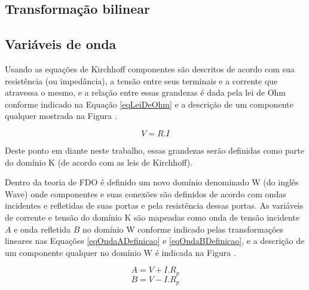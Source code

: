 	\subsection{Transformação bilinear}
	
	
	\subsection{Variáveis de onda}
	
	Usando as equações de Kirchhoff componentes são descritos de acordo com sua resistência (ou impedância), a tensão entre seus terminais e a corrente que atravessa o mesmo, e a relação entre essas grandezas é dada pela lei de Ohm conforme indicado na Equação \ref{eqLeiDeOhm} e a descrição de um componente qualquer mostrada na Figura .
	
	\begin{equation}
	\label{eqLeiDeOhm}
		V = R . I
	\end{equation} 
	
	Deste ponto em diante neste trabalho, essas grandezas serão definidas como parte do domínio K (de acordo com as leis de Kirchhoff). 
	
	\cite{Fettweis1986}	Dentro da teoria de FDO é definido um novo domínio denominado W (do inglês Wave) onde componentes e suas conexões são definidos de acordo com ondas incidentes e refletidas de suas portas e pela resistência dessas portas. As variáveis de corrente e tensão do domínio K são mapeadas como onda de tensão incidente $A$ e onda refletida $B$ no domínio W conforme indicado pelas transformações lineares nas Equações \ref{eqOndaADefinicao} e \ref{eqOndaBDefinicao}, e a descrição de um componente qualquer no domínio W é indicada na Figura .
	
	\begin{equation}
	\label{eqOndaADefinicao}
		A = V + I . R_p
	\end{equation}
	\begin{equation}
	\label{eqOndaBDefinicao}
		B = V - I . R_p
	\end{equation}
	

